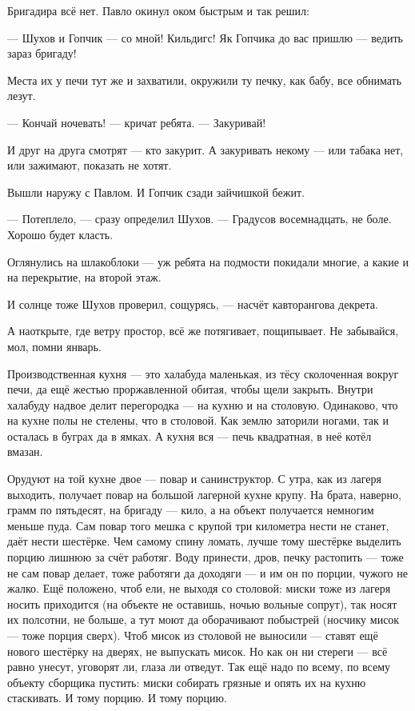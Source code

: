 Бригадира всё нет. Павло окинул оком быстрым и так решил:

--- Шухов и Гопчик --- со мной! Кильдигс! Як Гопчика до вас пришлю --- ведить зараз бригаду!

Места их у печи тут же и захватили, окружили ту печку, как бабу, все обнимать лезут.

--- Кончай ночевать! --- кричат ребята. --- Закуривай!

И друг на друга смотрят --- кто закурит. А закуривать некому --- или табака нет, или зажимают, 
показать не хотят.

Вышли наружу с Павлом. И Гопчик сзади зайчишкой бежит.

--- Потеплело, --- сразу определил Шухов. --- Градусов восемнадцать, не боле. Хорошо будет класть.

Оглянулись на шлакоблоки --- уж ребята на подмости покидали многие, а какие и на перекрытие, 
на второй этаж.

И солнце тоже Шухов проверил, сощурясь, --- насчёт кавторангова декрета.

А наоткрыте, где ветру простор, всё же потягивает, пощипывает. Не забывайся, мол, помни январь.

Производственная кухня --- это халабуда маленькая, из тёсу сколоченная вокруг печи, да ещё 
жестью проржавленной обитая, чтобы щели закрыть. Внутри халабуду надвое делит перегородка 
--- на кухню и на столовую. Одинаково, что на кухне полы не стелены, что в столовой. Как землю 
заторили ногами, так и осталась в буграх да в ямках. А кухня вся --- печь квадратная, в неё 
котёл вмазан.

Орудуют на той кухне двое --- повар и санинструктор. С утра, как из лагеря выходить, получает 
повар на большой лагерной кухне крупу. На брата, наверно, грамм по пятьдесят, на бригаду --- 
кило, а на объект получается немногим меньше пуда. Сам повар того мешка с крупой три 
километра нести не станет, даёт нести шестёрке. Чем самому спину ломать, лучше тому шестёрке 
выделить порцию лишнюю за счёт работяг. Воду принести, дров, печку растопить --- тоже не сам 
повар делает, тоже работяги да доходяги --- и им он по порции, чужого не жалко. Ещё положено, 
чтоб ели, не выходя со столовой: миски тоже из лагеря носить приходится (на объекте не 
оставишь, ночью вольные сопрут), так носят их полсотни, не больше, а тут моют да оборачивают 
побыстрей (носчику мисок --- тоже порция сверх). Чтоб мисок из столовой не выносили --- ставят 
ещё нового шестёрку на дверях, не выпускать мисок. Но как он ни стереги --- всё равно унесут, 
уговорят ли, глаза ли отведут. Так ещё надо по всему, по всему объекту сборщика пустить: миски 
собирать грязные и опять их на кухню стаскивать. И тому порцию. И тому порцию.

